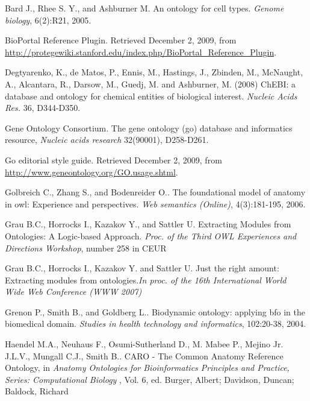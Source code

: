 \documentclass[jou]{ao2e}%
\begin{document}
\begin{thebibliography}{}

 Bard J., Rhee S. Y., and Ashburner M. An ontology for cell types. \textit{Genome biology}, 6(2):R21, 2005. 

 BioPortal Reference Plugin. Retrieved December 2, 2009, from \url{http://protegewiki.stanford.edu/index.php/BioPortal_Reference_Plugin}.

 Degtyarenko, K., de Matos, P., Ennis, M., Hastings, J., Zbinden, M., McNaught, A., Alcantara, R., Darsow, M., Guedj, M. and Ashburner, M. (2008) ChEBI: a database and ontology for chemical entities of biological interest. \textit{Nucleic Acids Res.} 36, D344-D350.

Gene Ontology Consortium. The gene ontology (go) database and informatics resource, \textit{Nucleic acids research} 32(90001), D258-D261.

 Go editorial style guide. Retrieved December 2, 2009, from \url{http://www.geneontology.org/GO.usage.shtml}.

 Golbreich C., Zhang S., and Bodenreider O.. The foundational model of anatomy in owl: Experience and perspectives. \textit{Web semantics (Online)}, 4(3):181-195, 2006. 

 Grau B.C., Horrocks I., Kazakov Y., and Sattler U. Extracting Modules from Ontologies: A Logic-based Approach. \textit{Proc. of the Third OWL Experiences and Directions Workshop}, number 258 in CEUR

 Grau B.C., Horrocks I., Kazakov Y. and Sattler U. Just the right amount: Extracting modules from ontologies.\textit{In proc. of the 16th International World Wide Web Conference (WWW 2007)}

 Grenon P., Smith B., and Goldberg L.. Biodynamic ontology: applying bfo in the biomedical domain. \textit{Studies in health 
technology and informatics}, 102:20-38, 2004. 

 Haendel M.A., Neuhaus F., Osumi-Sutherland D., M. Mabee P., Mejino Jr. J.L.V., Mungall C.J., Smith B.. CARO - The Common Anatomy Reference Ontology, in \textit{Anatomy Ontologies for Bioinformatics Principles and Practice, Series: Computational Biology} , Vol. 6, ed. Burger, Albert; Davidson, Duncan; Baldock, Richard


\end{thebibliography}
\end{document}

